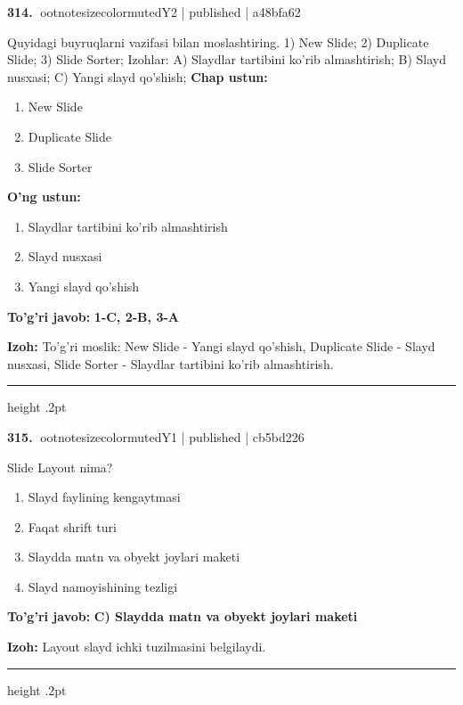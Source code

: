 \documentclass[10pt,a4paper]{article}
\begin{document}
\textbf{\color{ink}314.} {ootnotesizecolor{muted}Y2 | published | a48bfa62}
\par
Quyidagi buyruqlarni vazifasi bilan moslashtiring.  1) New Slide;  2) Duplicate Slide;  3) Slide Sorter;  Izohlar: A) Slaydlar tartibini ko'rib almashtirish;  B) Slayd nusxasi;  C) Yangi slayd qo'shish;
\textbf{Chap ustun:}\begin{enumerate}[label=\arabic*),leftmargin=9mm]
\item New Slide
\item Duplicate Slide
\item Slide Sorter
\end{enumerate}
\textbf{O'ng ustun:}\begin{enumerate}[label=\Alph*),leftmargin=9mm]
\item Slaydlar tartibini ko'rib almashtirish
\item Slayd nusxasi
\item Yangi slayd qo'shish
\end{enumerate}
\begin{tcolorbox}[enhanced,breakable,colback=teal!4,colframe=teal!55!black,boxrule=0.45pt,arc=1.2mm,left=2.8mm,right=2.8mm,top=2mm,bottom=2mm]
\textbf{\color{teal}To'g'ri javob:} \textbf{1-C, 2-B, 3-A}
\par\smallskip
\textbf{Izoh:} To'g'ri moslik: New Slide - Yangi slayd qo'shish, Duplicate Slide - Slayd nusxasi, Slide Sorter - Slaydlar tartibini ko'rib almashtirish.
\end{tcolorbox}
\vspace{2mm}\hrule height .2pt\vspace{2mm}

\textbf{\color{ink}315.} {ootnotesizecolor{muted}Y1 | published | cb5bd226}
\par
Slide Layout nima?
\begin{enumerate}[label=\Alph*),leftmargin=9mm]
\item Slayd faylining kengaytmasi
\item Faqat shrift turi
\item Slaydda matn va obyekt joylari maketi
\item Slayd namoyishining tezligi
\end{enumerate}
\begin{tcolorbox}[enhanced,breakable,colback=teal!4,colframe=teal!55!black,boxrule=0.45pt,arc=1.2mm,left=2.8mm,right=2.8mm,top=2mm,bottom=2mm]
\textbf{\color{teal}To'g'ri javob:} \textbf{C) Slaydda matn va obyekt joylari maketi}
\par\smallskip
\textbf{Izoh:} Layout slayd ichki tuzilmasini belgilaydi.
\end{tcolorbox}
\vspace{2mm}\hrule height .2pt\vspace{2mm}
\end{document}
